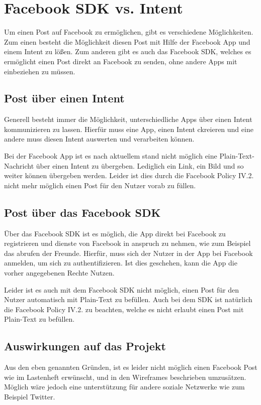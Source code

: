 \section{Facebook SDK vs. Intent} \label{Facebook SDK}
Um einen Post auf Facebook zu erm\"oglichen, gibt es verschiedene M\"oglichkeiten. Zum einen besteht die M\"oglichkeit diesen Post mit Hilfe der Facebook App und einem Intent zu l\"o\ss{}en. Zum anderen gibt es auch das Facebook SDK, welches es erm\"oglicht einen Post direkt an Facebook zu senden, ohne andere Apps mit einbeziehen zu m\"ussen.

\subsection{Post \"uber einen Intent}
Generell besteht immer die M\"oglichkeit, unterschiedliche Apps \"uber einen Intent kommunizieren zu lassen. Hierf\"ur muss eine App, einen Intent ckreieren und eine andere muss diesen Intent auswerten und verarbeiten k\"onnen.

Bei der Facebook App ist es nach aktuellem stand nicht m\"oglich eine Plain-Text-Nachricht \"uber einen Intent zu \"ubergeben. Lediglich ein Link, ein Bild und so weiter k\"onnen \"ubergeben werden. Leider ist dies durch die Facebook Policy IV.2. nicht mehr m\"oglich einen Post f\"ur den Nutzer vorab zu f\"ullen. \cite{fbPolicy2}


\subsection{Post \"uber das Facebook SDK}
\"Uber das Facebook SDK ist es m\"oglich, die App direkt bei Facebook zu registrieren und dienste von Facebook in anspruch zu nehmen, wie zum Beispiel das abrufen der Freunde.
Hierf\"ur, muss sich der Nutzer in der App bei Facebook anmelden, um sich zu authentifizieren. Ist dies geschehen, kann die App die vorher angegebenen Rechte Nutzen.

Leider ist es auch mit dem Facebook SDK nicht m\"oglich, einen Post f\"ur den Nutzer automatisch mit Plain-Text zu bef\"ullen. Auch bei dem SDK ist nat\"urlich die Facebook Policy IV.2. zu beachten, welche es nicht erlaubt einen Post mit Plain-Text zu bef\"ullen. \cite{fbPolicy2} 

\subsection{Auswirkungen auf das Projekt}
Aus den eben genannten Gr\"unden, ist es leider nicht m\"oglich einen Facebook Post wie im Lastenheft erw\"unscht, und in den Wireframes beschrieben umzus\"atzen.
M\"oglich w\"are jedoch eine unterst\"utzung f\"ur andere soziale Netzwerke wie zum Beispiel Twitter.